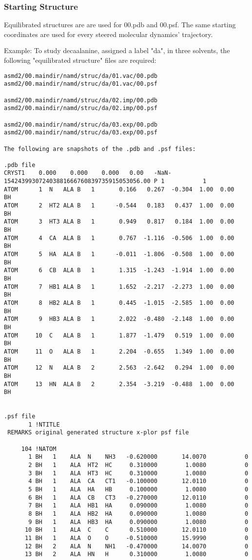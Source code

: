 \documentclass[11pt]{article}
\begin{document}
\subsubsection{Starting Structure}
Equilibrated structures are are used for 00.pdb and 00.psf. The same starting coordinates are used for every steered molecular dynamics' trajectory.

Example: To study decaalanine, assigned a label "da", in three solvents, the following "equilibrated structure" files are required:

\begin{verbatim}
asmd2/00.maindir/namd/struc/da/01.vac/00.pdb
asmd2/00.maindir/namd/struc/da/01.vac/00.psf

asmd2/00.maindir/namd/struc/da/02.imp/00.pdb
asmd2/00.maindir/namd/struc/da/02.imp/00.psf

asmd2/00.maindir/namd/struc/da/03.exp/00.pdb
asmd2/00.maindir/namd/struc/da/03.exp/00.psf

The following are snapshots of the .pdb and .psf files:

.pdb file
CRYST1    0.000    0.000    0.000   0.00   -NaN-154243993072403881666760839735915053056.00 P 1           1
ATOM      1  N   ALA B   1       0.166   0.267  -0.304  1.00  0.00      BH  
ATOM      2  HT2 ALA B   1      -0.544   0.183   0.437  1.00  0.00      BH  
ATOM      3  HT3 ALA B   1       0.949   0.817   0.184  1.00  0.00      BH  
ATOM      4  CA  ALA B   1       0.767  -1.116  -0.506  1.00  0.00      BH  
ATOM      5  HA  ALA B   1      -0.011  -1.806  -0.508  1.00  0.00      BH  
ATOM      6  CB  ALA B   1       1.315  -1.243  -1.914  1.00  0.00      BH  
ATOM      7  HB1 ALA B   1       1.652  -2.217  -2.273  1.00  0.00      BH  
ATOM      8  HB2 ALA B   1       0.445  -1.015  -2.585  1.00  0.00      BH  
ATOM      9  HB3 ALA B   1       2.022  -0.480  -2.148  1.00  0.00      BH  
ATOM     10  C   ALA B   1       1.877  -1.479   0.519  1.00  0.00      BH  
ATOM     11  O   ALA B   1       2.204  -0.655   1.349  1.00  0.00      BH  
ATOM     12  N   ALA B   2       2.563  -2.642   0.294  1.00  0.00      BH  
ATOM     13  HN  ALA B   2       2.354  -3.219  -0.488  1.00  0.00      BH  


.psf file
       1 !NTITLE
 REMARKS original generated structure x-plor psf file

     104 !NATOM
       1 BH   1    ALA  N    NH3   -0.620000       14.0070           0
       2 BH   1    ALA  HT2  HC     0.310000        1.0080           0
       3 BH   1    ALA  HT3  HC     0.310000        1.0080           0
       4 BH   1    ALA  CA   CT1   -0.100000       12.0110           0
       5 BH   1    ALA  HA   HB     0.100000        1.0080           0
       6 BH   1    ALA  CB   CT3   -0.270000       12.0110           0
       7 BH   1    ALA  HB1  HA     0.090000        1.0080           0
       8 BH   1    ALA  HB2  HA     0.090000        1.0080           0
       9 BH   1    ALA  HB3  HA     0.090000        1.0080           0
      10 BH   1    ALA  C    C      0.510000       12.0110           0
      11 BH   1    ALA  O    O     -0.510000       15.9990           0
      12 BH   2    ALA  N    NH1   -0.470000       14.0070           0
      13 BH   2    ALA  HN   H      0.310000        1.0080           0


\end{verbatim}
\end{document}
